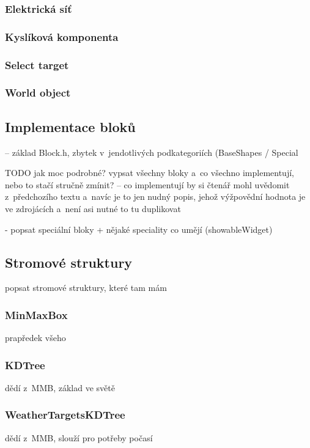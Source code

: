 \subsubsection{Elektrická síť}


\subsubsection{Kyslíková komponenta}


\subsubsection{Select target}


\subsubsection{World object}






\subsection{Implementace bloků}
 -- základ Block.h, zbytek v~jendotlivých podkategoriích (BaseShapes / Special
 
 TODO jak moc podrobné? vypsat všechny bloky a~co všechno implementují, nebo to stačí stručně zmínit? -- co implementují by si čtenář mohl uvědomit z~předchozího textu a~navíc je to jen nudný popis, jehož výžpovědní hodnota je ve zdrojácích a~není asi nutné to tu duplikovat

- popsat speciální bloky + nějaké speciality co umějí (showableWidget)


\subsection{Stromové struktury}
popsat stromové struktury, které tam mám


\subsubsection{MinMaxBox}

prapředek všeho



\subsubsection{KDTree}

dědí z~MMB, základ ve světě


\subsubsection{WeatherTargetsKDTree}

dědí z~MMB, slouží pro potřeby počasí